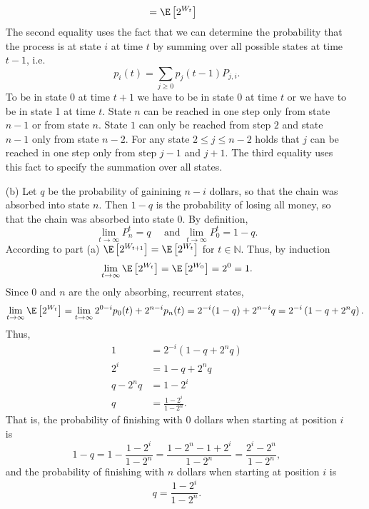 \begin{enumerate}
\begin{align*}
      &= \E\left[2^{W_t}\right]
  \end{align*}
  The second equality uses the fact that we can determine the probability that the
  process is at state $i$ at time $t$ by summing over all possible states at time
  $t - 1$, i.e.
  \[ p_i(t) = \sum_{j \geq 0} p_j(t-1)P_{j,i}. \]
  To be in state 0 at time $t+1$ we have to be in state 0 at time $t$ or we have
  to be in state 1 at time $t$. State $n$ can be reached in one step only from state
  $n-1$ or from state $n$. State $1$ can only be reached from step $2$ and state
  $n-1$ only from state $n-2$. For any state $2 \leq j \leq n-2$ holds that $j$
  can be reached in one step only from step $j-1$ and $j+1$. The third equality
  uses this fact to specify the summation over all states.
  \item[(b)] Let $q$ be the probability of gainining $n-i$ dollars, so that the
  chain was absorbed into state $n$. Then $1-q$ is the probability of losing all
  money, so that the chain was absorbed into state 0. By definition,
  \[
   \lim_{t \to \infty} P_n^t = q \quad \text{ and } \lim_{t \to \infty} P_0^t = 1-q.
  \]
  According to part (a) $\E\left[2^{W_{t+1}}\right] = \E\left[2^{W_t}\right]$ for
  $t \in \mathbb{N}$. Thus, by induction
  \begin{align*}
    \lim_{t \to \infty} \E\left[2^{W_t}\right] = \E\left[2^{W_0}\right] = 2^0 = 1.
  \end{align*}
  Since 0 and $n$ are the only absorbing, recurrent states,
  \begin{align*}
    \lim_{t \to \infty} \E\left[2^{W_t}\right]
      = \lim_{t \to \infty} 2^{0-i} p_0(t) + 2^{n-i} p_n(t)
      = 2^{-i}(1-q) + 2^{n-i}q
      = 2^{-i}\left(1 - q + 2^n q\right).
  \end{align*}
  Thus,
  \begin{align*}
    1           &= 2^{-i}\left(1 - q + 2^n q\right) \\
    2^i         &= 1 - q + 2^n q \\
    q - 2^n q   &= 1 - 2^i \\
    q           &= \frac{1-2^i}{1-2^n}.
  \end{align*}
  That is, the probability of finishing with 0 dollars when starting at position
  $i$ is
  \[ 1 - q
    = 1 - \frac{1-2^i}{1-2^n}
    = \frac{1 - 2^n - 1 + 2^i}{1 - 2^n}
    =  \frac{2^i - 2^n}{1 - 2^n},
  \]
  and the probability of finishing with $n$ dollars when starting at position
  $i$ is
  \[ q = \frac{1-2^i}{1-2^n}. \]


\end{enumerate}

